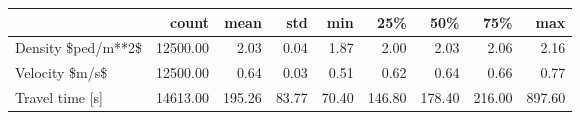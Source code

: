 \begin{tabular}{lrrrrrrrr}
\toprule
{} &    count &   mean &   std &   min &    25\% &    50\% &    75\% &    max \\
\midrule
Density \$ped/m**2\$ & 12500.00 &   2.03 &  0.04 &  1.87 &   2.00 &   2.03 &   2.06 &   2.16 \\
Velocity \$m/s\$     & 12500.00 &   0.64 &  0.03 &  0.51 &   0.62 &   0.64 &   0.66 &   0.77 \\
Travel time [s]    & 14613.00 & 195.26 & 83.77 & 70.40 & 146.80 & 178.40 & 216.00 & 897.60 \\
\bottomrule
\end{tabular}
